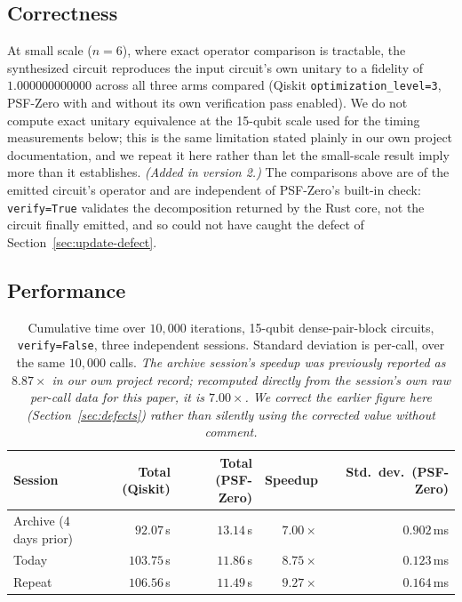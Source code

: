 \documentclass[11pt]{article}
\begin{document}
\subsection{Correctness}

At small scale ($n=6$), where exact operator comparison is tractable,
the synthesized circuit reproduces the input circuit's own unitary to a
fidelity of $1.000000000000$ across all three arms compared (Qiskit
\texttt{optimization\_level=3}, PSF-Zero with and without its own
verification pass enabled). We do not compute exact unitary equivalence
at the 15-qubit scale used for the timing measurements below; this is
the same limitation stated plainly in our own project documentation,
and we repeat it here rather than let the small-scale result imply
more than it establishes. \emph{(Added in version 2.)} The comparisons
above are of the emitted circuit's operator and are independent of
PSF-Zero's built-in check: \texttt{verify=True} validates the
decomposition returned by the Rust core, not the circuit finally emitted,
and so could not have caught the defect of
Section~\ref{sec:update-defect}.

\subsection{Performance}

\begin{table}[h]
\centering
\begin{tabular}{lrrrr}
\toprule
Session & Total (Qiskit) & Total (PSF-Zero) & Speedup & Std.\ dev.\ (PSF-Zero) \\
\midrule
Archive (4 days prior) & $92.07$\,s & $13.14$\,s & $7.00\times$ & $0.902$\,ms \\
Today & $103.75$\,s & $11.86$\,s & $8.75\times$ & $0.123$\,ms \\
Repeat & $106.56$\,s & $11.49$\,s & $9.27\times$ & $0.164$\,ms \\
\bottomrule
\end{tabular}
\caption{Cumulative time over $10{,}000$ iterations, 15-qubit
dense-pair-block circuits, \texttt{verify=False}, three independent
sessions. Standard deviation is per-call, over the same $10{,}000$
calls. \emph{The archive session's speedup was previously reported as
$8.87\times$ in our own project record; recomputed directly from the
session's own raw per-call data for this paper, it is $7.00\times$. We
correct the earlier figure here (Section~\ref{sec:defects}) rather than
silently using the corrected value without comment.}}
\label{tab:synth-perf}
\end{table}
\end{document}
